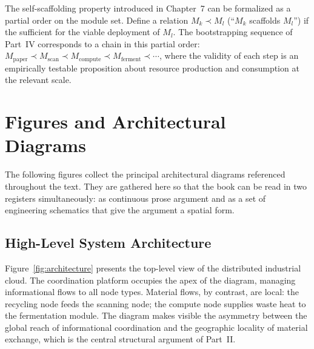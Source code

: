 \documentclass[12pt]{book}
\theoremstyle{definition}
\theoremstyle{remark}
\begin{document}
The self-scaffolding property introduced in Chapter~7 can be
formalized as a partial order on the module set. Define a
relation $M_k \prec M_l$ (\enquote{$M_k$ scaffolds $M_l$}) if the
sufficient for the viable deployment of $M_l$. The bootstrapping
sequence of Part~IV corresponds to a chain in this partial order:
$M_{\text{paper}} \prec M_{\text{scan}} \prec M_{\text{compute}}
\prec M_{\text{ferment}} \prec \cdots$, where the validity of
each step is an empirically testable proposition about resource
production and consumption at the relevant scale.

\chapter{Figures and Architectural Diagrams}
\label{ch:diagrams}

The following figures collect the principal architectural diagrams
referenced throughout the text. They are gathered here so that the
book can be read in two registers simultaneously: as continuous prose
argument and as a set of engineering schematics that give the
argument a spatial form.

\section{High-Level System Architecture}

Figure~\ref{fig:architecture} presents the top-level view of the
distributed industrial cloud. The coordination platform occupies
the apex of the diagram, managing informational flows to all node
types. Material flows, by contrast, are local: the recycling node
feeds the scanning node; the compute node supplies waste heat to
the fermentation module. The diagram makes visible the asymmetry
between the global reach of informational coordination and the
geographic locality of material exchange, which is the central
structural argument of Part~II.
\end{document}
